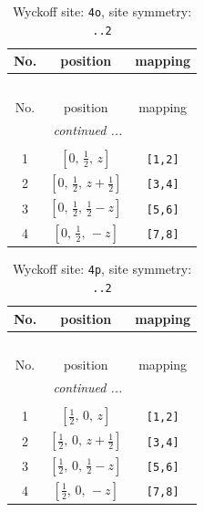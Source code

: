 \documentclass[fleqn,8pt]{jsarticle}
\begin{document}
\renewcommand{\arraystretch}{1.2}
\begin{longtable}{ccc}
\caption{Wyckoff site: {\tt 4o}, site symmetry: {\tt ..2}}
 \\
 \hline \hline
No. & position & mapping \\ \hline \endfirsthead

\multicolumn{2}{l}{\tablename\ \thetable{}} \\
 \hline \hline
No. & position & mapping \\ \hline \endhead

 \hline \hline
\multicolumn{2}{r}{\footnotesize\it continued ...} \\ \endfoot

 \hline \hline
\multicolumn{2}{r}{} \\ \endlastfoot

1 & $\left[ 0,\, \frac{1}{2},\, z \right]$ & {\tt [1,2]} \\ \hline
2 & $\left[ 0,\, \frac{1}{2},\, z + \frac{1}{2} \right]$ & {\tt [3,4]} \\ \hline
3 & $\left[ 0,\, \frac{1}{2},\, \frac{1}{2} - z \right]$ & {\tt [5,6]} \\ \hline
4 & $\left[ 0,\, \frac{1}{2},\, - z \right]$ & {\tt [7,8]} \\
\end{longtable}
\renewcommand{\arraystretch}{1.2}
\begin{longtable}{ccc}
\caption{Wyckoff site: {\tt 4p}, site symmetry: {\tt ..2}}
 \\
 \hline \hline
No. & position & mapping \\ \hline \endfirsthead

\multicolumn{2}{l}{\tablename\ \thetable{}} \\
 \hline \hline
No. & position & mapping \\ \hline \endhead

 \hline \hline
\multicolumn{2}{r}{\footnotesize\it continued ...} \\ \endfoot

 \hline \hline
\multicolumn{2}{r}{} \\ \endlastfoot

1 & $\left[ \frac{1}{2},\, 0,\, z \right]$ & {\tt [1,2]} \\ \hline
2 & $\left[ \frac{1}{2},\, 0,\, z + \frac{1}{2} \right]$ & {\tt [3,4]} \\ \hline
3 & $\left[ \frac{1}{2},\, 0,\, \frac{1}{2} - z \right]$ & {\tt [5,6]} \\ \hline
4 & $\left[ \frac{1}{2},\, 0,\, - z \right]$ & {\tt [7,8]} \\
\end{longtable}
\end{document}
